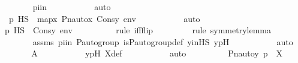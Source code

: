 \begin{isabellebody}
\ \ \ \ \ \ \ \ \isamarkupfalse%
\ piin\ \isanewline
\ \ \ \ \ \ \ \ \isamarkupfalse%
\ auto\isanewline
\ \ \ \ \ \ \isamarkupfalse%
\ \isamarkupfalse%
\ {\isachardoublequoteopen}{\isachardot}{\kern0pt}{\isachardot}{\kern0pt}{\isachardot}{\kern0pt}\ {\isasymlongleftrightarrow}\ \ {\isasympi}{\isacharbackquote}{\kern0pt}p\ {\isasymtturnstile}HS\ {\isasymphi}\ map{\isacharparenleft}{\kern0pt}{\isasymlambda}x{\isachardot}{\kern0pt}\ Pn{\isacharunderscore}{\kern0pt}auto{\isacharparenleft}{\kern0pt}{\isasympi}{\isacharparenright}{\kern0pt}{\isacharbackquote}{\kern0pt}x{\isacharcomma}{\kern0pt}\ Cons{\isacharparenleft}{\kern0pt}y{\isacharcomma}{\kern0pt}\ env{\isacharparenright}{\kern0pt}{\isacharparenright}{\kern0pt}\ {\isachardoublequoteclose}\isanewline
\ \ \ \ \ \ \ \ \isamarkupfalse%
\ auto\isanewline
\ \ \ \ \ \ \isamarkupfalse%
\ \isamarkupfalse%
\ {\isachardoublequoteopen}{\isachardot}{\kern0pt}{\isachardot}{\kern0pt}{\isachardot}{\kern0pt}\ {\isasymlongleftrightarrow}\ p\ {\isasymtturnstile}HS\ {\isasymphi}\ Cons{\isacharparenleft}{\kern0pt}y{\isacharcomma}{\kern0pt}\ env{\isacharparenright}{\kern0pt}{\isachardoublequoteclose}\ \isanewline
\ \ \ \ \ \ \ \ \isamarkupfalse%
{\isacharparenleft}{\kern0pt}rule\ iff{\isacharunderscore}{\kern0pt}flip{\isacharparenright}{\kern0pt}\isanewline
\ \ \ \ \ \ \ \ \isamarkupfalse%
{\isacharparenleft}{\kern0pt}rule\ symmetry{\isacharunderscore}{\kern0pt}lemma{\isacharparenright}{\kern0pt}\isanewline
\ \ \ \ \ \ \ \ \isamarkupfalse%
\ assms\ piin{\isasymG}\ {\isasymG}{\isacharunderscore}{\kern0pt}P{\isacharunderscore}{\kern0pt}auto{\isacharunderscore}{\kern0pt}group\ is{\isacharunderscore}{\kern0pt}P{\isacharunderscore}{\kern0pt}auto{\isacharunderscore}{\kern0pt}group{\isacharunderscore}{\kern0pt}def\ yinHS\ ypH\ \isanewline
\ \ \ \ \ \ \ \ \isamarkupfalse%
\ auto\isanewline
\ \ \ \ \ \ \isamarkupfalse%
\ \isamarkupfalse%
\ {\isachardoublequoteopen}{\isacharquery}{\kern0pt}A{\isachardoublequoteclose}\ \isanewline
\ \ \ \ \ \ \ \ \isamarkupfalse%
\ ypH\ X{\isacharunderscore}{\kern0pt}def\ \isanewline
\ \ \ \ \ \ \ \ \isamarkupfalse%
\ auto\isanewline
\ \ \ \ \ \ \isamarkupfalse%
\ \isamarkupfalse%
\ {\isachardoublequoteopen}{\isacharless}{\kern0pt}Pn{\isacharunderscore}{\kern0pt}auto{\isacharparenleft}{\kern0pt}{\isasympi}{\isacharparenright}{\kern0pt}{\isacharbackquote}{\kern0pt}y{\isacharcomma}{\kern0pt}\ {\isasympi}{\isacharbackquote}{\kern0pt}p{\isachargreater}{\kern0pt}\ {\isasymin}\ X{\isachardoublequoteclose}\ \isanewline

\end{isabellebody}
